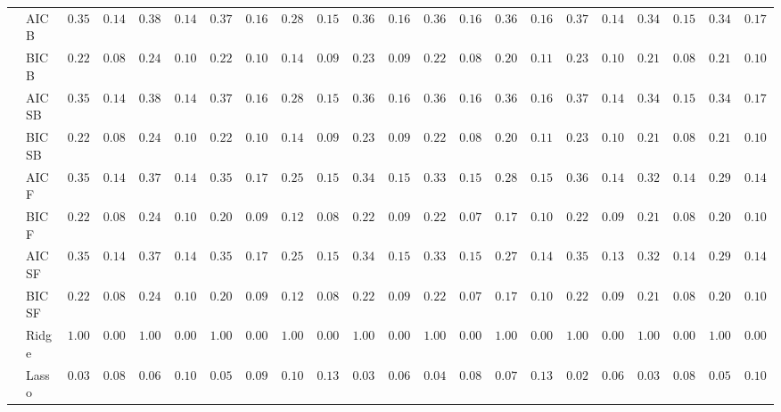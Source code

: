 \begin{tabular}{p{0.2cm}p{1cm}|p{0.6cm}p{0.6cm}|p{0.6cm}p{0.6cm}p{0.6cm}p{0.6cm}p{0.6cm}p{0.6cm}|p{0.6cm}p{0.6cm}p{0.6cm}p{0.6cm}p{0.6cm}p{0.6cm}|p{0.6cm}p{0.6cm}p{0.6cm}p{0.6cm}p{0.6cm}p{0.6cm}}
 & AIC B  & $0.3583$ & $0.1486$ & $0.3867$ & $0.1496$ & $0.3750$ & $0.1681$ & $0.2883$ & $0.1587$ & $0.3617$ & $0.1625$ & $0.3650$ & $0.1670$ & $0.3617$ & $0.1642$ & $0.3767$ & $0.1472$ & $0.3467$ & $0.1511$ & $0.3433$ & $0.1754$ \\
 & BIC B  & $0.2217$ & $0.0856$ & $0.2433$ & $0.1017$ & $0.2233$ & $0.1039$ & $0.1467$ & $0.0956$ & $0.2300$ & $0.0941$ & $0.2250$ & $0.0866$ & $0.2000$ & $0.1161$ & $0.2333$ & $0.1005$ & $0.2133$ & $0.0889$ & $0.2183$ & $0.1051$ \\
 & AIC SB  & $0.3583$ & $0.1486$ & $0.3867$ & $0.1496$ & $0.3750$ & $0.1681$ & $0.2883$ & $0.1587$ & $0.3617$ & $0.1625$ & $0.3650$ & $0.1670$ & $0.3617$ & $0.1642$ & $0.3767$ & $0.1472$ & $0.3467$ & $0.1511$ & $0.3433$ & $0.1754$ \\
 & BIC SB  & $0.2217$ & $0.0856$ & $0.2433$ & $0.1017$ & $0.2233$ & $0.1039$ & $0.1467$ & $0.0956$ & $0.2300$ & $0.0941$ & $0.2267$ & $0.0871$ & $0.2000$ & $0.1161$ & $0.2333$ & $0.1005$ & $0.2133$ & $0.0889$ & $0.2183$ & $0.1051$ \\
 & AIC F  & $0.3517$ & $0.1458$ & $0.3783$ & $0.1438$ & $0.3517$ & $0.1723$ & $0.2500$ & $0.1544$ & $0.3450$ & $0.1522$ & $0.3350$ & $0.1598$ & $0.2867$ & $0.1500$ & $0.3600$ & $0.1435$ & $0.3283$ & $0.1469$ & $0.2933$ & $0.1482$ \\
 & BIC F  & $0.2217$ & $0.0856$ & $0.2400$ & $0.1041$ & $0.2067$ & $0.0921$ & $0.1233$ & $0.0842$ & $0.2283$ & $0.0937$ & $0.2217$ & $0.0788$ & $0.1783$ & $0.1039$ & $0.2250$ & $0.0929$ & $0.2117$ & $0.0882$ & $0.2067$ & $0.1008$ \\
 & AIC SF  & $0.3517$ & $0.1458$ & $0.3783$ & $0.1438$ & $0.3500$ & $0.1700$ & $0.2500$ & $0.1544$ & $0.3450$ & $0.1522$ & $0.3333$ & $0.1553$ & $0.2783$ & $0.1442$ & $0.3583$ & $0.1389$ & $0.3283$ & $0.1469$ & $0.2917$ & $0.1448$ \\
 & BIC SF  & $0.2217$ & $0.0856$ & $0.2400$ & $0.1041$ & $0.2067$ & $0.0921$ & $0.1233$ & $0.0842$ & $0.2283$ & $0.0937$ & $0.2217$ & $0.0788$ & $0.1783$ & $0.1039$ & $0.2250$ & $0.0929$ & $0.2117$ & $0.0882$ & $0.2067$ & $0.1008$ \\
 & Ridge  & $1.0000$ & $0.0000$ & $1.0000$ & $0.0000$ & $1.0000$ & $0.0000$ & $1.0000$ & $0.0000$ & $1.0000$ & $0.0000$ & $1.0000$ & $0.0000$ & $1.0000$ & $0.0000$ & $1.0000$ & $0.0000$ & $1.0000$ & $0.0000$ & $1.0000$ & $0.0000$ \\
 & Lasso  & $0.0383$ & $0.0849$ & $0.0633$ & $0.1054$ & $0.0533$ & $0.0944$ & $0.1017$ & $0.1399$ & $0.0317$ & $0.0699$ & $0.0450$ & $0.0849$ & $0.0733$ & $0.1304$ & $0.0250$ & $0.0643$ & $0.0350$ & $0.0831$ & $0.0500$ & $0.1019$ \\

\end{tabular}
